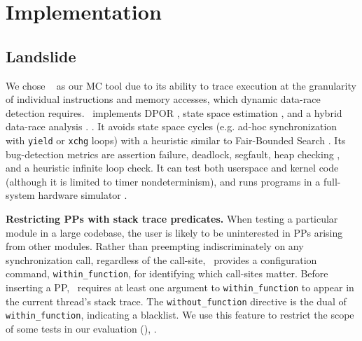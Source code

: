 \section{Implementation}
\label{sec:implementation}

\subsection{Landslide}
\label{sec:landslide}

We chose \landslide~\cite{landslide} as our MC tool due to its ability to trace execution at the granularity of individual instructions and memory accesses, which dynamic data-race detection requires.
\landslide~implements DPOR \cite{dpor},
state space estimation \cite{estimation}, and a hybrid
data-race analysis \cite{hybriddatarace}.
.
It avoids state space cycles (e.g. ad-hoc synchronization with {\tt yield} or {\tt xchg} loops) with a heuristic similar to Fair-Bounded Search \cite{bpor}.
Its bug-detection metrics are assertion failure, deadlock, segfault, heap checking \cite{valgrind}, and a heuristic infinite loop check.
It can test both userspace and kernel code (although it is limited to timer nondeterminism),
and runs programs in a full-system hardware simulator \cite{simics}.

{\bf Restricting PPs with stack trace predicates.}
When testing a particular module in a large codebase,
the user is likely to be uninterested in PPs arising from other modules.
Rather than preempting indiscriminately on any synchronization call, regardless of the call-site,
\landslide~provides a configuration command, {\tt within\_function}, for identifying which call-sites matter.
Before inserting a PP, \landslide~requires at least one argument to {\tt within\_function} to appear in the current thread's stack trace.
The {\tt without\_\allowbreak{}function} directive is the dual of {\tt within\_function}, indicating a blacklist.
We use this feature to restrict the scope of some tests in our evaluation (\sect{\ref{sec:testsuite}}),
.

